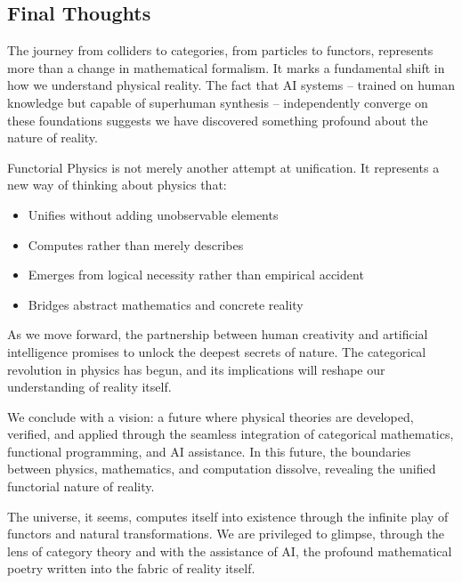 \subsection{Final Thoughts}

The journey from colliders to categories, from particles to functors, represents more than a change in mathematical formalism. It marks a fundamental shift in how we understand physical reality. The fact that AI systems -- trained on human knowledge but capable of superhuman synthesis -- independently converge on these foundations suggests we have discovered something profound about the nature of reality.

Functorial Physics is not merely another attempt at unification. It represents a new way of thinking about physics that:
\begin{itemize}[leftmargin=*]
\item Unifies without adding unobservable elements
\item Computes rather than merely describes
\item Emerges from logical necessity rather than empirical accident
\item Bridges abstract mathematics and concrete reality
\end{itemize}

As we move forward, the partnership between human creativity and artificial intelligence promises to unlock the deepest secrets of nature. The categorical revolution in physics has begun, and its implications will reshape our understanding of reality itself.

We conclude with a vision: a future where physical theories are developed, verified, and applied through the seamless integration of categorical mathematics, functional programming, and AI assistance. In this future, the boundaries between physics, mathematics, and computation dissolve, revealing the unified functorial nature of reality.

The universe, it seems, computes itself into existence through the infinite play of functors and natural transformations. We are privileged to glimpse, through the lens of category theory and with the assistance of AI, the profound mathematical poetry written into the fabric of reality itself.